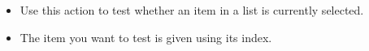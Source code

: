 \begin{itemize}
\item Use this action to test whether an item in a list is currently selected. 
\item The item you want to test is given using its index. 
\end{itemize}
